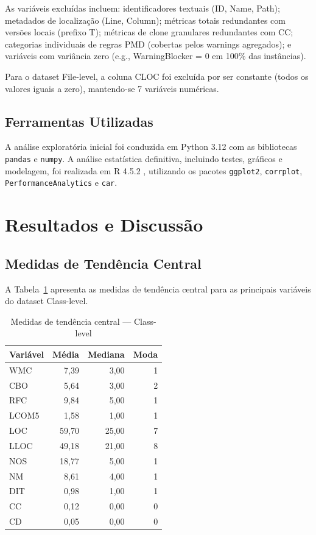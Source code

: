 \documentclass[12pt]{article}
\begin{document}
As variáveis excluídas incluem: identificadores textuais (ID, Name, Path); metadados de localização (Line, Column); métricas totais redundantes com versões locais (prefixo T); métricas de clone granulares redundantes com CC; categorias individuais de regras PMD (cobertas pelos warnings agregados); e variáveis com variância zero (e.g., WarningBlocker = 0 em 100\% das instâncias).

Para o dataset File-level, a coluna CLOC foi excluída por ser constante (todos os valores iguais a zero), mantendo-se 7 variáveis numéricas.

\subsection{Ferramentas Utilizadas}

A análise exploratória inicial foi conduzida em Python 3.12 com as bibliotecas \texttt{pandas} e \texttt{numpy}. A análise estatística definitiva, incluindo testes, gráficos e modelagem, foi realizada em R 4.5.2 \cite{rcoreteam2024}, utilizando os pacotes \texttt{ggplot2}, \texttt{corrplot}, \texttt{PerformanceAnalytics} e \texttt{car}.

\section{Resultados e Discussão} \label{sec:resultados}

\subsection{Medidas de Tendência Central}

A Tabela~\ref{tab:tendencia_class} apresenta as medidas de tendência central para as principais variáveis do dataset Class-level.

\begin{table}[H]
\centering
\caption{Medidas de tendência central --- Class-level}
\label{tab:tendencia_class}
\small
\begin{tabular}{lrrr}
\toprule
\textbf{Variável} & \textbf{Média} & \textbf{Mediana} & \textbf{Moda} \\
\midrule
WMC   & 7,39   & 3,00   & 1 \\
CBO   & 5,64   & 3,00   & 2 \\
RFC   & 9,84   & 5,00   & 1 \\
LCOM5 & 1,58   & 1,00   & 1 \\
LOC   & 59,70  & 25,00  & 7 \\
LLOC  & 49,18  & 21,00  & 8 \\
NOS   & 18,77  & 5,00   & 1 \\
NM    & 8,61   & 4,00   & 1 \\
DIT   & 0,98   & 1,00   & 1 \\
CC    & 0,12   & 0,00   & 0 \\
CD    & 0,05   & 0,00   & 0 \\
\bottomrule
\end{tabular}
\end{table}
\end{document}
